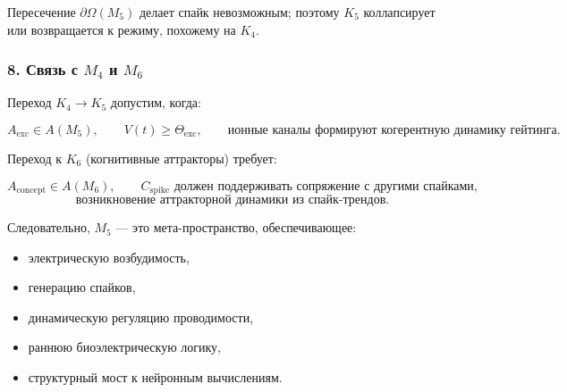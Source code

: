 Пересечение $\partial\Omega(M_5)$ делает спайк невозможным;
поэтому $K_5$ коллапсирует или возвращается к режиму, похожему на $K_4$.

\subsubsection*{8. Связь с \texorpdfstring{$M_4$}{M_4} и \texorpdfstring{$M_6$}{M_6}}

Переход $K_4 \to K_5$ допустим, когда:

\[
A_{\mathrm{exc}} \in A(M_5),
\qquad
V(t) \ge \Theta_{\mathrm{exc}},
\qquad
\text{ионные каналы формируют когерентную динамику гейтинга}.
\]

Переход к $K_6$ (когнитивные аттракторы) требует:

\[
A_{\mathrm{concept}} \in A(M_6),
\qquad
C_{\mathrm{spike}} \text{ должен поддерживать сопряжение с другими спайками},
\]
\[
\text{возникновение аттракторной динамики из спайк-трендов}.
\]

Следовательно, $M_5$ — это мета-пространство, обеспечивающее:

\begin{itemize}
    \item электрическую возбудимость,
    \item генерацию спайков,
    \item динамическую регуляцию проводимости,
    \item раннюю биоэлектрическую логику,
    \item структурный мост к нейронным вычислениям.
\end{itemize}

